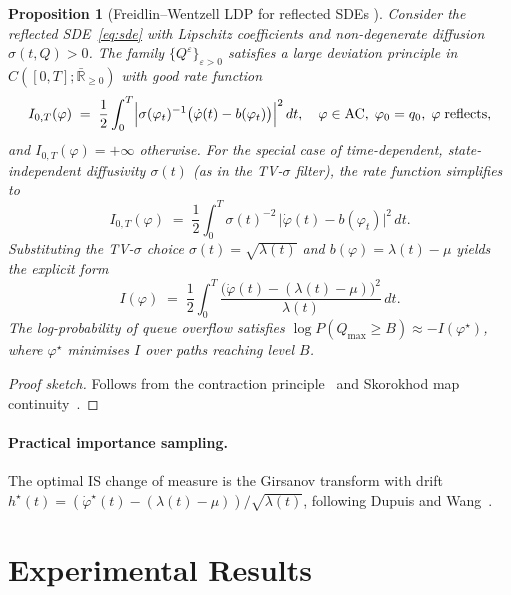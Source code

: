 \documentclass[pdflatex,sn-mathphys-num]{sn-jnl}
\theoremstyle{thmstyleone}%
\newtheorem{proposition}{Proposition}%
\theoremstyle{thmstyletwo}%
\theoremstyle{thmstylethree}%
\begin{document}
\begin{proposition}[Freidlin--Wentzell LDP for reflected SDEs {\cite{dupuis1997large,xu2009large}}]
\label{prop:rate_function}
Consider the reflected SDE~\eqref{eq:sde} with Lipschitz coefficients and
non-degenerate diffusion $\sigma(t,Q) > 0$.  The family $\{Q^\varepsilon\}_{\varepsilon>0}$
satisfies a large deviation principle in $C([0,T];\bar{\mathbb{R}}_{\ge 0})$ with good
rate function
\begin{equation}
    I_{0,T}(\varphi) \;=\; \frac{1}{2}\int_0^T
    \Bigl|\sigma(\varphi_t)^{-1}\bigl(\dot\varphi(t) - b(\varphi_t)\bigr)\Bigr|^2\,dt,
    \quad \varphi \in \mathrm{AC},\;\varphi_0 = q_0,\;\varphi \;\text{reflects},
    \label{eq:rate_general}
\end{equation}
and $I_{0,T}(\varphi) = +\infty$ otherwise.
For the special case of \emph{time-dependent, state-independent} diffusivity $\sigma(t)$
(as in the TV-$\sigma$ filter), the rate function simplifies to
\begin{equation}
    I_{0,T}(\varphi) \;=\; \frac{1}{2}\int_0^T
    \sigma(t)^{-2}\,\bigl|\dot\varphi(t) - b(\varphi_t)\bigr|^2\,dt .
    \label{eq:rate_si}
\end{equation}
Substituting the TV-$\sigma$ choice $\sigma(t) = \sqrt{\lambda(t)}$ and
$b(\varphi) = \lambda(t) - \mu$ yields the explicit form
\begin{equation}
    I(\varphi) \;=\; \frac{1}{2}\int_0^T
    \frac{\bigl(\dot\varphi(t) - (\lambda(t)-\mu)\bigr)^2}{\lambda(t)}\,dt .
    \label{eq:rate_function}
\end{equation}
The log-probability of queue overflow satisfies
$\log P(Q_{\max} \ge B) \approx -I(\varphi^{\star})$, where $\varphi^{\star}$ minimises
$I$ over paths reaching level $B$.
\end{proposition}
\begin{proof}[Proof sketch]
Follows from the contraction principle~\cite{dupuis1997large} and Skorokhod map
continuity~\cite{xu2009large}.
\end{proof}

\paragraph{Practical importance sampling.}
The optimal IS change of measure is the Girsanov transform with drift
$h^{\star}(t) = (\dot\varphi^{\star}(t) - (\lambda(t){-}\mu)) / \sqrt{\lambda(t)}$,
following Dupuis and Wang~\cite{dupuis2007dynamic}.


\section{Experimental Results}
\end{document}

